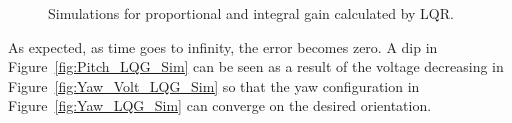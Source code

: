 \begin{figure}[!htbp]
    \centering
    \caption{Simulations for proportional and integral gain calculated by LQR.}
\end{figure}
As expected, as time goes to infinity, the error becomes zero.  A dip in Figure~\ref{fig:Pitch_LQG_Sim} can be seen as a result of the voltage decreasing in Figure~\ref{fig:Yaw_Volt_LQG_Sim} so that the yaw configuration in Figure~\ref{fig:Yaw_LQG_Sim} can converge on the desired orientation.

